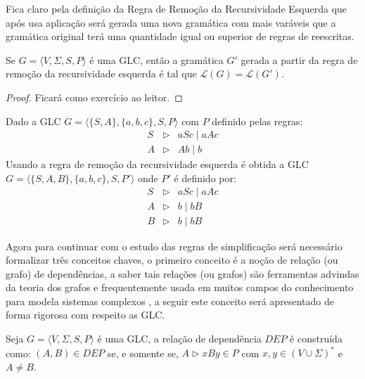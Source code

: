 Fica claro pela definição da Regra de Remoção da Recursividade Esquerda que após usa aplicação será gerada uma nova gramática com mais varáveis que a gramática original terá uma quantidade igual ou superior de regras de reescritas.

\begin{theorem}\label{teo:SuplificacaoGLC-Rec}
    Se $G = \langle V, \Sigma, S, P\rangle$ é uma GLC, então a gramática $G'$ gerada a partir da regra de remoção da recursividade esquerda é tal que $\mathcal{L}(G) = \mathcal{L}(G')$.
\end{theorem}

\begin{proof}
    Ficará como exercício ao leitor.
\end{proof}

\begin{example}
    Dado a GLC $G = \langle \{S, A\}, \{a,b, c\}, S, P \rangle$ com $P$ definido pelas regras:
    \begin{eqnarray*}
        S & \rhd & aSc \mid aAc\\
        A & \rhd & Ab \mid b
    \end{eqnarray*}
    Usando a regra de remoção da recursividade esquerda é obtida a GLC $G = \langle \{S, A, B\}, \{a, b, c\}, S, P' \rangle$ onde $P'$ é definido por:
    \begin{eqnarray*}
        S & \rhd & aSc \mid aAc\\
        A & \rhd & b \mid bB\\
        B & \rhd & b \mid bB 
    \end{eqnarray*}
\end{example}

Agora para continuar com o estudo das regras de simplificação será necessário formalizar três conceitos chaves, o primeiro conceito é a noção de relação (ou grafo) de dependências, a saber tais relações (ou grafos) são ferramentas advindas da teoria dos grafos e frequentemente usada em muitos campos do conhecimento para modela sistemas complexos \cite{benjaLivro2010}, a seguir este conceito será apresentado de forma rigorosa com respeito as GLC.

\begin{definition}\label{def:GrafoDependencia}
    Seja $G = \langle V, \Sigma, S, P\rangle$ é uma GLC, a relação de dependência $DEP$ é construída como: $(A, B) \in DEP$ se, e somente se, $A \rhd xBy \in P$ com $x, y \in (V \cup \Sigma)^*$ e $A \neq B$.
\end{definition}

